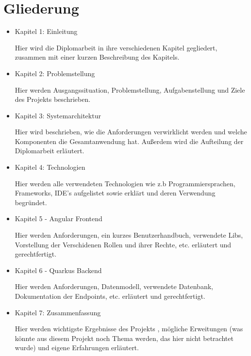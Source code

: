 \section{Gliederung}

\begin{itemize}
    \item  Kapitel 1: Einleitung
    
    Hier wird die Diplomarbeit in ihre verschiedenen Kapitel gegliedert, zusammen mit einer kurzen Beschreibung des Kapitels.
    
    \item  Kapitel 2: Problemstellung
    
    Hier werden Ausgangssituation, Problemstellung, Aufgabenstellung und Ziele des Projekts beschrieben.
    
    \item  Kapitel 3: Systemarchitektur
    
    Hier wird beschrieben, wie die Anforderungen verwirklicht werden und welche Komponenten die Gesamtanwendung hat. 
    Außerdem wird die Aufteilung der Diplomarbeit erläutert.

    \item  Kapitel 4: Technologien
    
    Hier werden alle verwendeten Technologien wie z.b Programmiersprachen, Frameworks, IDE's aufgelistet sowie erklärt und deren Verwendung begründet.

    \item  Kapitel 5 - Angular Frontend
    
    Hier werden Anforderungen, ein kurzes Benutzerhandbuch, verwendete Libs, Vorstellung der Verschidenen Rollen und ihrer Rechte, etc. erläutert und gerechtfertigt.
    
    \item  Kapitel 6 - Quarkus Backend
    
    Hier werden Anforderungen, Datenmodell, verwendete Datenbank, Dokumentation der Endpoints, etc. erläutert und gerechtfertigt.

    
    \item  Kapitel 7: Zusammenfassung
    
    Hier werden wichtigste Ergebnisse des Projekts , mögliche Erweitungen (was könnte aus diesem Projekt noch Thema werden, 
    das hier nicht betrachtet wurde) und eigene Erfahrungen erläutert.
\end{itemize}
